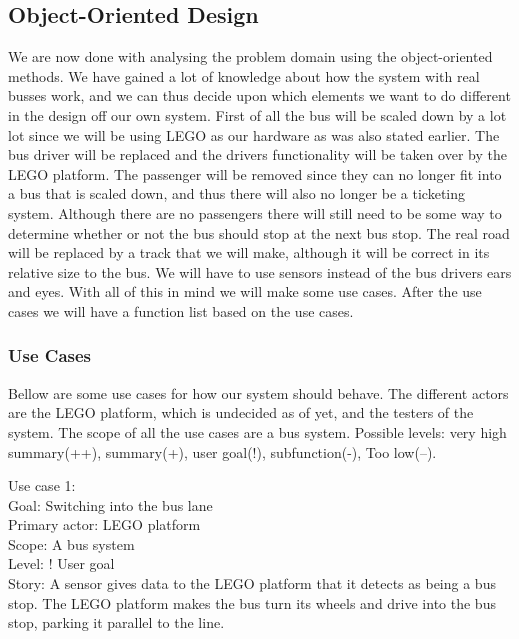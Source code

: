 \subsection{Object-Oriented Design}


We are now done with analysing the problem domain using the object-oriented methods. We have gained a lot of knowledge about how the system with real busses work, and we can thus decide upon which elements we want to do different in the design off our own system.
First of all the bus will be scaled down by a lot lot since we will be using LEGO as our hardware as was also stated earlier. The bus driver will be replaced and the drivers functionality will be taken over by the LEGO platform.
The passenger will be removed since  they can no longer fit into a bus that is scaled down, and thus there will also no longer be a ticketing system.
Although there are no passengers there will still need to be some way to determine whether or not the bus should stop at the next bus stop.
The real road will be replaced by a track that we will make, although it will be correct in its relative size to the bus.
We will have to use sensors instead of the bus drivers ears and eyes.
With all of this in mind we will make some use cases. After the use cases we will have a function list based on the use cases.


\subsubsection{Use Cases}
Bellow are some use cases for how our system should behave. The different actors are the LEGO platform, which is undecided as of yet, and the testers of the system. The scope of all the use cases are a bus system. Possible levels: very high summary(++), summary(+), user goal(!), subfunction(-), Too low(--).

Use case 1:\\
Goal: Switching into the bus lane\\
Primary actor: LEGO platform\\
Scope: A bus system\\
Level: ! User goal\\
Story: A sensor gives data to the LEGO platform that it detects as being a bus stop. The LEGO platform makes the bus turn its wheels and drive into the bus stop, parking it parallel to the line.

